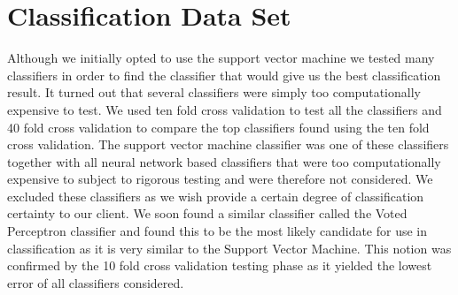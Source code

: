 \documentclass[%
        compressed,
        final,
        notitlepage,
        narroweqnarray,
        inline,
        twoside,
        ]{ieee}
\begin{document}
\section{Classification Data Set}
Although we initially opted to use the support vector machine we tested many classifiers in order to find the classifier that would give us the best classification result. It turned out that several classifiers were simply too computationally expensive to test. We used ten fold cross validation to test all the classifiers and 40 fold cross validation to compare the top classifiers found using the ten fold cross validation. The support vector machine classifier was one of these classifiers together with all neural network based classifiers that were too computationally expensive to subject to rigorous testing and were therefore not considered. We excluded these classifiers as we wish provide a certain degree of classification certainty to our client. We soon found a similar classifier called the Voted Perceptron classifier and found this to be the most likely candidate for use in classification as it is very similar to the Support Vector Machine. This notion was confirmed by the 10 fold cross validation testing phase as it yielded the lowest error of all classifiers considered.
\end{document}
